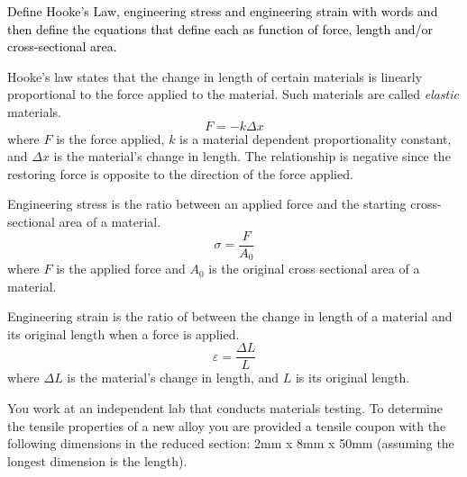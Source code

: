 \documentclass[answers]{exam}
\begin{document}
\begin{questions}
\question[6] \textcolor{black}{Define Hooke’s Law, engineering stress and engineering strain with words and then define the equations that define each as function of force, length and/or cross-sectional area.}

\begin{solution}
    Hooke's law states that the change in length of certain materials is linearly proportional to the force applied to the material. Such materials are called \textit{elastic} materials.
    \begin{equation*}
        F = -k\Delta x
    \end{equation*}
    {\small where $F$ is the force applied, $k$ is a material dependent proportionality constant, and $\Delta x$ is the material's change in length. The relationship is negative since the restoring force is opposite to the direction of the force applied.}

    Engineering stress is the ratio between an applied force and the starting cross-sectional area of a material. 
    \begin{equation*}
        \sigma = \frac{F}{A_0}
    \end{equation*}
    {\small where $F$ is the applied force and $A_0$ is the original cross sectional area of a material.}

    Engineering strain is the ratio of between the change in length of a material and its original length when a force is applied. 
    \begin{equation*}
        \varepsilon = \frac{\Delta L}{L}
    \end{equation*}
    {\small where $\Delta L$ is the material's change in length, and $L$ is its original length.}

    
\end{solution}



\question You work at an independent lab that conducts materials testing. To
determine the tensile properties of a new alloy you are provided a tensile
coupon with the following dimensions in the reduced section: 2mm x 8mm x 50mm
(assuming the longest dimension is the length).
\end{questions}
\end{document}
